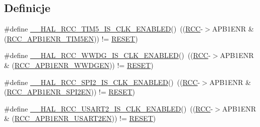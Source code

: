 \subsection*{Definicje}
\begin{DoxyCompactItemize}
\item 
\#define \hyperlink{group___r_c_c___a_p_b1___peripheral___clock___enable___disable___status_ga76f0a16fed0812fbab8bf15621939c8b}{\+\_\+\+\_\+\+H\+A\+L\+\_\+\+R\+C\+C\+\_\+\+T\+I\+M5\+\_\+\+I\+S\+\_\+\+C\+L\+K\+\_\+\+E\+N\+A\+B\+L\+ED}()~((\hyperlink{group___peripheral__declaration_ga74944438a086975793d26ae48d5882d4}{R\+CC}-\/$>$A\+P\+B1\+E\+NR \& (\hyperlink{group___peripheral___registers___bits___definition_ga49abbbc8fd297c544df2d337b28f80e4}{R\+C\+C\+\_\+\+A\+P\+B1\+E\+N\+R\+\_\+\+T\+I\+M5\+EN})) != \hyperlink{group___exported__types_gga89136caac2e14c55151f527ac02daaffa589b7d94a3d91d145720e2fed0eb3a05}{R\+E\+S\+ET})
\item 
\#define \hyperlink{group___r_c_c___a_p_b1___peripheral___clock___enable___disable___status_ga9b26aff2638d1e0613b0ce0530f0cd48}{\+\_\+\+\_\+\+H\+A\+L\+\_\+\+R\+C\+C\+\_\+\+W\+W\+D\+G\+\_\+\+I\+S\+\_\+\+C\+L\+K\+\_\+\+E\+N\+A\+B\+L\+ED}()~((\hyperlink{group___peripheral__declaration_ga74944438a086975793d26ae48d5882d4}{R\+CC}-\/$>$A\+P\+B1\+E\+NR \& (\hyperlink{group___peripheral___registers___bits___definition_gaf712b922ee776a972d2efa3da0ea4733}{R\+C\+C\+\_\+\+A\+P\+B1\+E\+N\+R\+\_\+\+W\+W\+D\+G\+EN})) != \hyperlink{group___exported__types_gga89136caac2e14c55151f527ac02daaffa589b7d94a3d91d145720e2fed0eb3a05}{R\+E\+S\+ET})
\item 
\#define \hyperlink{group___r_c_c___a_p_b1___peripheral___clock___enable___disable___status_ga282522dda9557cf715be3ee13c031a5b}{\+\_\+\+\_\+\+H\+A\+L\+\_\+\+R\+C\+C\+\_\+\+S\+P\+I2\+\_\+\+I\+S\+\_\+\+C\+L\+K\+\_\+\+E\+N\+A\+B\+L\+ED}()~((\hyperlink{group___peripheral__declaration_ga74944438a086975793d26ae48d5882d4}{R\+CC}-\/$>$A\+P\+B1\+E\+NR \& (\hyperlink{group___peripheral___registers___bits___definition_gafdce64692c44bf95efbf2fed054e59be}{R\+C\+C\+\_\+\+A\+P\+B1\+E\+N\+R\+\_\+\+S\+P\+I2\+EN})) != \hyperlink{group___exported__types_gga89136caac2e14c55151f527ac02daaffa589b7d94a3d91d145720e2fed0eb3a05}{R\+E\+S\+ET})
\item 
\#define \hyperlink{group___r_c_c___a_p_b1___peripheral___clock___enable___disable___status_gad3bbe0639658ed2cc56f8328b26373ea}{\+\_\+\+\_\+\+H\+A\+L\+\_\+\+R\+C\+C\+\_\+\+U\+S\+A\+R\+T2\+\_\+\+I\+S\+\_\+\+C\+L\+K\+\_\+\+E\+N\+A\+B\+L\+ED}()~((\hyperlink{group___peripheral__declaration_ga74944438a086975793d26ae48d5882d4}{R\+CC}-\/$>$A\+P\+B1\+E\+NR \& (\hyperlink{group___peripheral___registers___bits___definition_gab840af4f735ec36419d61c7db3cfa00d}{R\+C\+C\+\_\+\+A\+P\+B1\+E\+N\+R\+\_\+\+U\+S\+A\+R\+T2\+EN})) != \hyperlink{group___exported__types_gga89136caac2e14c55151f527ac02daaffa589b7d94a3d91d145720e2fed0eb3a05}{R\+E\+S\+ET})

\end{DoxyCompactItemize}
